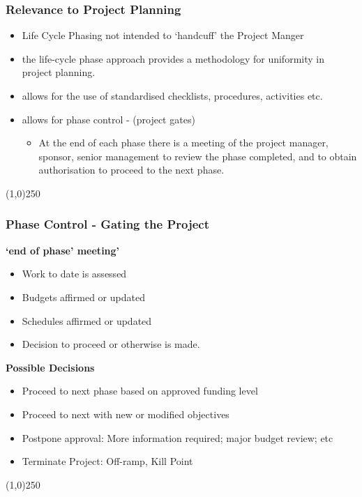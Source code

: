\begin{frame}
\frametitle{Relevance to Project Planning}
\begin{itemize}
	\item Life Cycle Phasing not intended to `handcuff' the Project Manger\\
	\item the life-cycle phase approach provides a methodology for uniformity in project planning.\\
	\item allows for the use of standardised checklists, procedures, activities etc.\\
	\item allows for phase control - (project gates)\\
		\begin{itemize}
			\item At the end of each phase there is a meeting of the project manager, sponsor, senior management to review the phase completed, and to obtain authorisation to proceed to the next phase.
		\end{itemize}
\end{itemize}
\end{frame}
\begin{center}\line(1,0){250}\end{center}



\begin{frame}
\frametitle{Phase Control - Gating the Project}
\textbf{`end of phase' meeting'}\\
\begin{itemize}
	\item Work to date is assessed
	\item Budgets affirmed or updated
	\item Schedules affirmed or updated
	\item Decision to proceed or otherwise is made.
\end{itemize}
\textbf{Possible Decisions}\\
\begin{itemize}
	\item Proceed to next phase based on approved funding level
	\item Proceed to next with new or modified objectives
	\item Postpone approval: More information required; major budget review; etc
	\item  Terminate Project: Off-ramp, Kill Point
\end{itemize}
\end{frame}
\begin{center}\line(1,0){250}\end{center}



